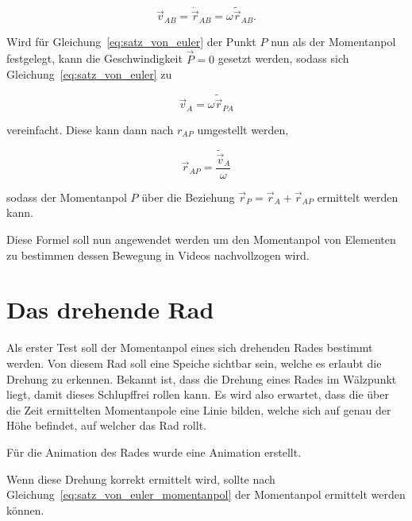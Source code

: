\begin{equation}
    \vec{v}_{AB} = \dot{\vec{r}}_{AB} = \omega \tilde{\vec{r}}_{AB}.
    \label{eq:absolut_zu_winkel}
\end{equation}

Wird für Gleichung~\ref{eq:satz_von_euler} der Punkt $P$ nun als der Momentanpol festgelegt, kann die Geschwindigkeit $\vec{P} = 0$ gesetzt werden,
sodass sich Gleichung~\ref{eq:satz_von_euler} zu

\begin{equation}
    \vec{v}_A = \omega \tilde{\vec{r}}_{PA}
    \label{eq:satz_von_euler_momentanpol}
\end{equation}

vereinfacht. 
Diese kann dann nach $r_{AP}$ umgestellt werden,

\begin{equation}
    \vec{r}_{AP} = \frac{\tilde{\vec{v}}_A}{\omega}
\end{equation}

sodass der Momentanpol $P$ über die Beziehung $\vec{r}_P = \vec{r}_A + \vec{r}_{AP}$ ermittelt werden kann.

Diese Formel soll nun angewendet werden um den Momentanpol von Elementen zu bestimmen dessen Bewegung in Videos nachvollzogen wird.

\section{Das drehende Rad}

Als erster Test soll der Momentanpol eines sich drehenden Rades bestimmt werden.
Von diesem Rad soll eine Speiche sichtbar sein, welche es erlaubt die Drehung zu erkennen.
Bekannt ist, dass die Drehung eines Rades im Wälzpunkt liegt, damit dieses Schlupffrei rollen kann.
Es wird also erwartet, dass die über die Zeit ermittelten Momentanpole eine Linie bilden, welche sich auf genau der Höhe befindet, auf welcher das Rad rollt.

Für die Animation des Rades wurde eine  Animation erstellt.



Wenn diese Drehung korrekt ermittelt wird, sollte nach Gleichung~\ref{eq:satz_von_euler_momentanpol} der Momentanpol ermittelt werden können.

